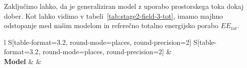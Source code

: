 Zaključimo lahko, da je generaliziran model z uporabo prostorskega toka dokaj dober. Kot lahko vidimo v tabeli~\ref{tab:stage2-field-3-tot}, imamo majhno odstopanje med našim modelom in referečno totalno energijsko porabo $EE_{tot}$.

\begin{table}[!htbp]
	\centering
	\begin{tabular}{l S[table-format=3.2, round-mode=places, round-precision=2] S[table-format=3.2, round-mode=places, round-precision=2]}
		\toprule
		&  \\
		\textbf{Model} &  &  \\
		\midrule
		\bottomrule
	\end{tabular}
	\caption[Totalna energijska poraba za protokol 3 2. terenske faze]{Totalna energijska poraba za protokol 3 2. terenske faze.}
	\label{tab:stage2-field-3-tot}
\end{table}







